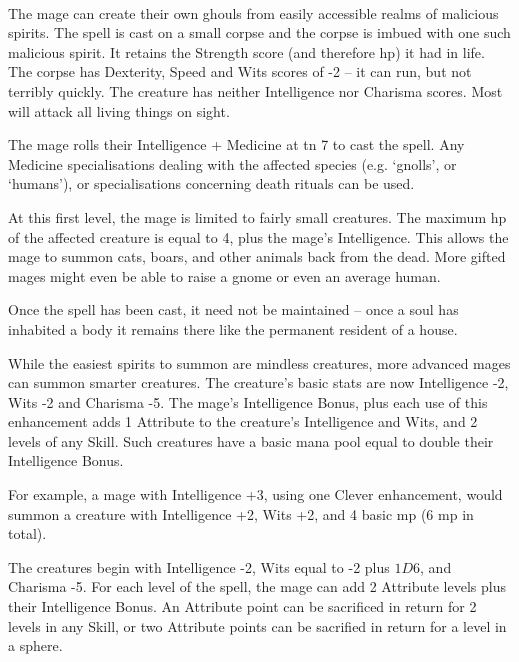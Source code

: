 \begin{multicols}{2}
\spelllevel

\\
The mage can create their own ghouls from easily accessible realms of malicious spirits. The spell is cast on a small corpse and the corpse is imbued with one such malicious spirit. It retains the Strength score (and therefore \gls{hp}) it had in life.
The corpse has Dexterity, Speed and Wits scores of -2 -- it can run, but not terribly quickly.
The creature has neither Intelligence nor Charisma scores. Most will attack all living things on sight.

The mage rolls their Intelligence + Medicine at \gls{tn} 7 to cast the spell. Any Medicine specialisations dealing with the affected species (e.g. `gnolls', or `humans'), or specialisations concerning death rituals can be used.

At this first level, the mage is limited to fairly small creatures.  The maximum \gls{hp} of the affected creature is equal to 4, plus the mage's Intelligence.  This allows the mage to summon cats, boars, and other animals back from the dead.  More gifted mages might even be able to raise a gnome or even an average human.

Once the spell has been cast, it need not be maintained -- once a soul has inhabited a body it remains there like the permanent resident of a house.


While the easiest spirits to summon are mindless creatures, more advanced mages can summon smarter creatures.  The creature's basic stats are now Intelligence -2, Wits -2 and Charisma -5.  The mage's Intelligence Bonus, plus each use of this enhancement adds 1 Attribute to the creature's Intelligence and Wits, and 2 levels of any Skill.  Such creatures have a basic mana pool equal to double their Intelligence Bonus.  

For example, a mage with Intelligence +3, using one Clever enhancement, would summon a creature with Intelligence +2, Wits +2, and 4 basic \gls{mp} (6 \gls{mp} in total).

The creatures begin with Intelligence -2, Wits equal to -2 plus $1D6$, and Charisma -5.  For each level of the spell, the mage can add 2 Attribute levels plus their Intelligence Bonus.  An Attribute point can be sacrificed in return for 2 levels in any Skill, or two Attribute points can be sacrified in return for a level in a sphere.


\end{multicols}
